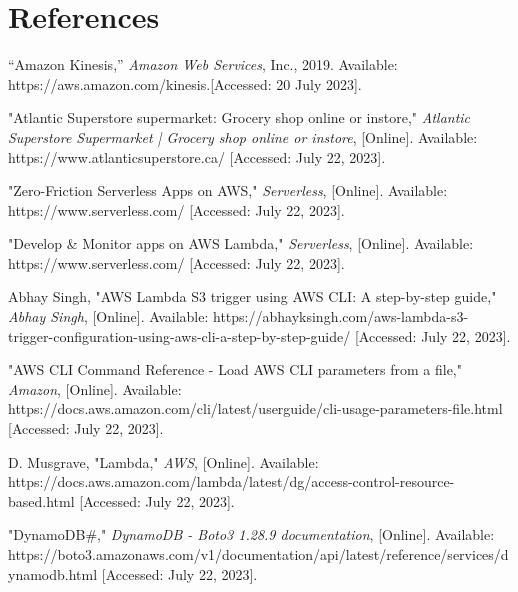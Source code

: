 
\section*{References}
\begin{sloppypar}

  \begin{enumerate}[label={[\arabic*]}]
  
    \item “Amazon Kinesis,” \textit{Amazon Web Services}, Inc., 2019. Available: https://aws.amazon.com/kinesis.[Accessed: 20 July 2023].
‌

    \item "Atlantic Superstore supermarket: Grocery shop online or instore," \textit{Atlantic Superstore Supermarket | Grocery shop online or instore}, [Online]. Available: https://www.atlanticsuperstore.ca/ [Accessed: July 22, 2023].


    \item "Zero-Friction Serverless Apps on AWS," \textit{Serverless}, [Online]. Available: https://www.serverless.com/ [Accessed: July 22, 2023].


    \item "Develop \& Monitor apps on AWS Lambda," \textit{Serverless}, [Online]. Available: https://www.serverless.com/ [Accessed: July 22, 2023].



    \item	Abhay Singh, "AWS Lambda S3 trigger using AWS CLI: A step-by-step guide," \textit{Abhay Singh}, [Online]. Available: https://abhayksingh.com/aws-lambda-s3-trigger-configuration-using-aws-cli-a-step-by-step-guide/ [Accessed: July 22, 2023].



    \item "AWS CLI Command Reference - Load AWS CLI parameters from a file," \textit{Amazon}, [Online].
    Available: https://docs.aws.amazon.com/cli/latest/userguide/cli-usage-parameters-file.html [Accessed: July 22, 2023].


    \item \parbox[t]{0.8\linewidth}{ D. Musgrave, "Lambda," \textit{AWS}, [Online]. Available: https://docs.aws.amazon.com/lambda/latest/dg/access-control-resource-based.html 
    [Accessed: July 22, 2023].}

    \item	"DynamoDB\#," \textit{DynamoDB - Boto3 1.28.9 documentation}, [Online]. Available: https://boto3.amazonaws.com/v1/documentation/api/latest/reference/services/dynamodb.html [Accessed: July 22, 2023].


\end{enumerate}
\end{sloppypar}
